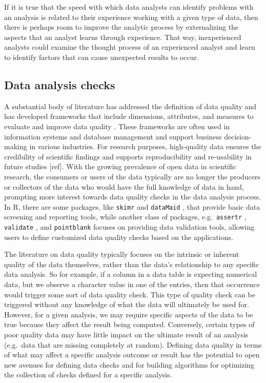 \documentclass[
  12pt,
]{interact}
\begin{document}
If it is true that the speed with which data analysts can identify
problems with an analysis is related to their experience working with a
given type of data, then there is perhaps room to improve the analytic
process by externalizing the aspects that an analyst learns through
experience. That way, inexperienced analysts could examine the thought
process of an experienced analyst and learn to identify factors that can
cause unexpected results to occur.

\subsection{Data analysis checks}\label{data-analysis-checks}

A substantial body of literature has addressed the definition of data
quality \citep[more]{8642813} and has developed frameworks that include
dimensions, attributes, and measures to evaluate and improve data
quality
\citep{cai2015challenges, wang1996beyond, 6204995, woodall2014classification}.
These frameworks are often used in information systems and database
management and support business decision-making in various industries.
For research purposes, high-quality data ensures the credibility of
scientific findings and supports reproducibility and re-usability in
future studies {[}ref{]}. With the growing prevalence of open data in
scientific research, the consumers or users of the data typically are no
longer the producers or collectors of the data who would have the full
knowledge of data in hand, prompting more interest towards data quality
checks in the data analysis process. In R, there are some packages, like
\texttt{skimr} \citep{skimr} and \texttt{dataMaid} \citep{dataMaid},
that provide basic data screening and reporting tools, while another
class of packages, e.g.~\texttt{assertr} \citep{assertr},
\texttt{validate} \citep{validate}, and \texttt{pointblank}
\citep{pointblank} focuses on providing data validation tools, allowing
users to define customized data quality checks based on the
applications.

The literature on data quality typically focuses on the intrinsic or
inherent quality of the data themselves, rather than the data's
relationship to any specific data analysis. So for example, if a column
in a data table is expecting numerical data, but we observe a character
value in one of the entries, then that occurrence would trigger some
sort of data quality check. This type of quality check can be triggered
without any knowledge of what the data will ultimately be used for.
However, for a given analysis, we may require specific aspects of the
data to be true because they affect the result being computed.
Conversely, certain types of poor quality data may have little impact on
the ultimate result of an analysis (e.g.~data that are missing
completely at random). Defining data quality in terms of what may affect
a specific analysis outcome or result has the potential to open new
avenues for defining data checks and for building algorithms for
optimizing the collection of checks defined for a specific analysis.
\end{document}
